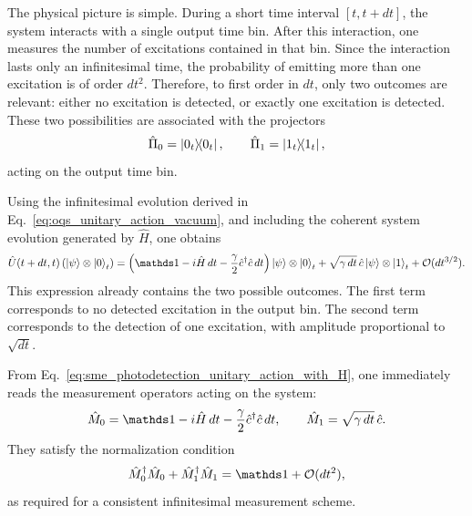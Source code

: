 The physical picture is simple. During a short time interval \([t,t+dt]\), the system interacts with a single output time bin. After this interaction, one measures the number of excitations contained in that bin. Since the interaction lasts only an infinitesimal time, the probability of emitting more than one excitation is of order \(dt^2\). Therefore, to first order in \(dt\), only two outcomes are relevant: either no excitation is detected, or exactly one excitation is detected. These two possibilities are associated with the projectors
\begin{equation}
	\hat \Pi_0=\dyad{0_t}{0_t},
	\qquad
	\hat \Pi_1=\dyad{1_t}{1_t},
	\label{eq:sme_photodetection_time_bin_projectors}
\end{equation}
acting on the output time bin.

Using the infinitesimal evolution derived in Eq.~\eqref{eq:oqs_unitary_action_vacuum}, and including the coherent system evolution generated by \(\hat H\), one obtains
\begin{equation}
	\hat U(t+dt,t)\left(\ket{\psi}\otimes\ket{0}_t\right)
	=
	\left(
	\id-i\hat H\,dt-\frac{\gamma}{2}\hat c^\dagger \hat c\,dt
	\right)\ket{\psi}\otimes\ket{0}_t
	+
	\sqrt{\gamma\,dt}\,\hat c\ket{\psi}\otimes\ket{1}_t
	+
	\mathcal{O}(dt^{3/2}).
	\label{eq:sme_photodetection_unitary_action_with_H}
\end{equation}
This expression already contains the two possible outcomes. The first term corresponds to no detected excitation in the output bin. The second term corresponds to the detection of one excitation, with amplitude proportional to \(\sqrt{dt}\).

From Eq.~\eqref{eq:sme_photodetection_unitary_action_with_H}, one immediately reads the measurement operators acting on the system:
\begin{equation}
	\hat M_0
	=
	\id-i\hat H\,dt-\frac{\gamma}{2}\hat c^\dagger \hat c\,dt,
	\qquad
	\hat M_1
	=
	\sqrt{\gamma\,dt}\,\hat c.
	\label{eq:sme_photodetection_measurement_operators}
\end{equation}
They satisfy the normalization condition
\begin{equation}
	\hat M_0^\dagger \hat M_0+\hat M_1^\dagger \hat M_1
	=
	\id+\mathcal{O}(dt^2),
	\label{eq:sme_photodetection_measurement_operators_normalization}
\end{equation}
as required for a consistent infinitesimal measurement scheme.

